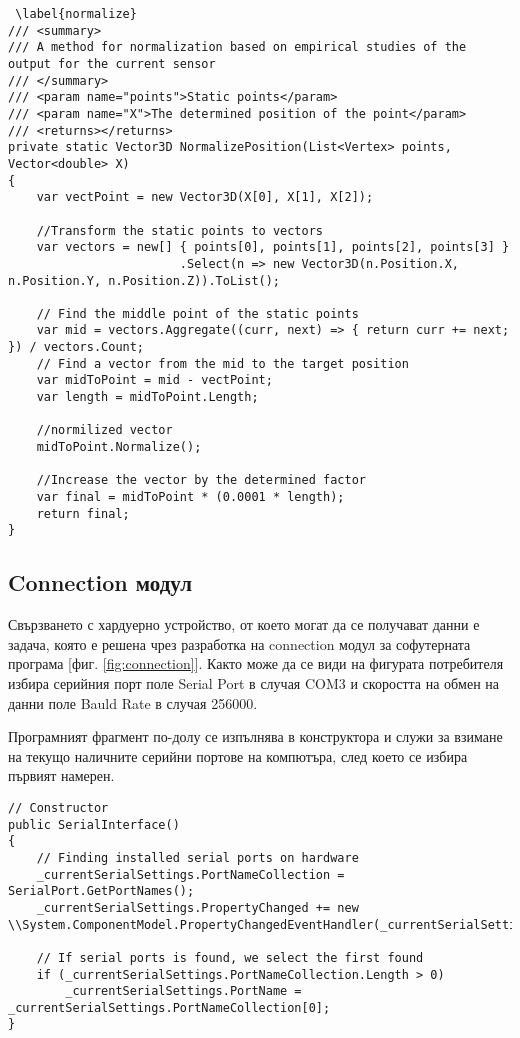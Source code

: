 \centerline{\begin{equation}
    
\end{equation}}

\begin{lstlisting} \label{normalize}
/// <summary>
/// A method for normalization based on empirical studies of the output for the current sensor
/// </summary>
/// <param name="points">Static points</param>
/// <param name="X">The determined position of the point</param>
/// <returns></returns>
private static Vector3D NormalizePosition(List<Vertex> points, Vector<double> X)
{
    var vectPoint = new Vector3D(X[0], X[1], X[2]);
    
    //Transform the static points to vectors
    var vectors = new[] { points[0], points[1], points[2], points[3] }
                        .Select(n => new Vector3D(n.Position.X, n.Position.Y, n.Position.Z)).ToList();

    // Find the middle point of the static points
    var mid = vectors.Aggregate((curr, next) => { return curr += next; }) / vectors.Count;
    // Find a vector from the mid to the target position
    var midToPoint = mid - vectPoint;
    var length = midToPoint.Length;

    //normilized vector
    midToPoint.Normalize();

    //Increase the vector by the determined factor
    var final = midToPoint * (0.0001 * length);
    return final;
}
\end{lstlisting}

\pagebreak



\subsection{Connection модул}\label{connModule}
Свързването с хардуерно устройство, от което могат да се получават данни е задача, която е решена чрез разработка на connection модул за софутерната програма [фиг. \ref{fig:connection}]. Както може да се види на фигурата потребителя избира серийния порт поле Serial Port в случая COM3 и скоростта на обмен на данни поле Bauld Rate в случая 256000.

Програмният фрагмент по-долу се изпълнява в конструктора и служи за взимане на текущо наличните серийни портове на компютъра, след което се избира първият намерен.
\begin{lstlisting}
// Constructor
public SerialInterface()
{
    // Finding installed serial ports on hardware
    _currentSerialSettings.PortNameCollection = SerialPort.GetPortNames();
    _currentSerialSettings.PropertyChanged += new \\System.ComponentModel.PropertyChangedEventHandler(_currentSerialSettings_PropertyChanged);

    // If serial ports is found, we select the first found
    if (_currentSerialSettings.PortNameCollection.Length > 0)
        _currentSerialSettings.PortName = _currentSerialSettings.PortNameCollection[0];
}
\end{lstlisting}



